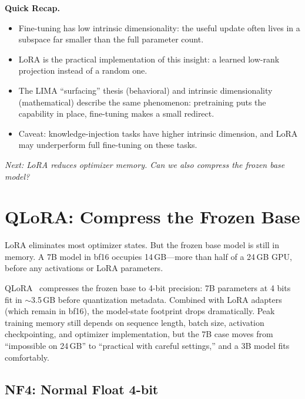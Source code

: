 \begin{quickrecap}
\textbf{Quick Recap.}
\begin{itemize}[nosep,leftmargin=1.5em]
  \item Fine-tuning has low intrinsic dimensionality: the useful update often lives in a subspace far smaller than the full parameter count.
  \item LoRA is the practical implementation of this insight: a learned low-rank projection instead of a random one.
  \item The LIMA ``surfacing'' thesis (behavioral) and intrinsic dimensionality (mathematical) describe the same phenomenon: pretraining puts the capability in place, fine-tuning makes a small redirect.
  \item Caveat: knowledge-injection tasks have higher intrinsic dimension, and LoRA may underperform full fine-tuning on these tasks.
\end{itemize}
\textit{Next: LoRA reduces optimizer memory. Can we also compress the frozen base model?}
\end{quickrecap}


\section{QLoRA: Compress the Frozen Base}
\label{sec:qlora}

LoRA eliminates most optimizer states. But the frozen base model is still in memory. A 7B model in bf16 occupies 14\,GB---more than half of a 24\,GB GPU, before any activations or LoRA parameters.

QLoRA~\cite{dettmers2023qlora} compresses the frozen base to 4-bit precision: 7B parameters at 4 bits fit in $\sim$3.5\,GB before quantization metadata. Combined with LoRA adapters (which remain in bf16), the model-state footprint drops dramatically. Peak training memory still depends on sequence length, batch size, activation checkpointing, and optimizer implementation, but the 7B case moves from ``impossible on 24\,GB'' to ``practical with careful settings,'' and a 3B model fits comfortably.

\subsection{NF4: Normal Float 4-bit}

